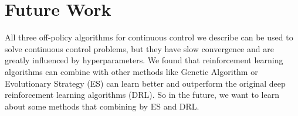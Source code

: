 \section{Future Work}
All three off-policy algorithms for continuous control we describe can be used to solve continuous control problems, but they have slow convergence and are greatly influenced by hyperparameters. We found that reinforcement learning algorithms can combine with other methods like Genetic Algorithm or Evolutionary Strategy (ES) can learn better and outperform the original deep reinforcement learning algorithms (DRL). So in the future, we want to learn about some methods that combining by ES and DRL.  



%
%



%
%


